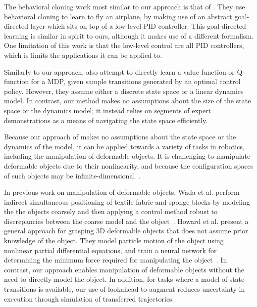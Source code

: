 The behavioral cloning work most similar to our approach is that of \citet{Isaac_ICML2003}.
They use behavioral cloning to learn to fly an airplane, by making use of an abstract goal-directed layer which sits on top of a low-level PID controller.
This goal-directed learning is similar in spirit to ours, although it makes use of a different formalism.
One limitation of this work is that the low-level control are all PID controllers, which is 
limits the applications it can be applied to.

Similarly to our approach, \citet{Dvijotham_ICML2010} also attempt to directly
learn a value function or Q-function for a MDP, given sample transitions
generated by an optimal control policy. However, they assume either a discrete
state space or a linear dynamics model. In contrast, our method makes no
assumptions about the size of the state space or the dynamics model; it instead
relies on segments of expert demonstrations as a means of navigating the state
space efficiently. 

Because our approach of \mmql{} makes no assumptions about the state space
or the dynamics of the model, it can be applied towards a variety of tasks
in robotics, including the manipulation of deformable objects.
It is challenging to manipulate deformable objects due to their nonlinearity,
and because the configuration spaces of such objects may be
infinite-dimensional~\cite{Lamiraux_IJRR2001}.

In previous work on manipulation of deformable objects,
Wada et al. perform indirect simultaneous positioning of
textile fabric and sponge blocks by modeling the
the objects coarsely and then applying a control method robust
to discrepancies between the coarse model and the
object~\cite{Wada_ArticMotion2000}. Howard et al. present a
general approach for grasping 3D deformable objects
that does not assume prior knowledge of the object.
They model particle motion of the object using nonlinear partial differential
equations, and train a neural network for determining the minimum force
required for manipulating the object~\cite{Howard_AutRobots2000}.
In contrast, our approach enables manipulation of deformable objects without
the need to directly model the object. In addition, for tasks
where a model of state-transitions is available, our use of
lookahead to augment \mmql{} reduces uncertainty in execution through
simulation of transferred trajectories.

